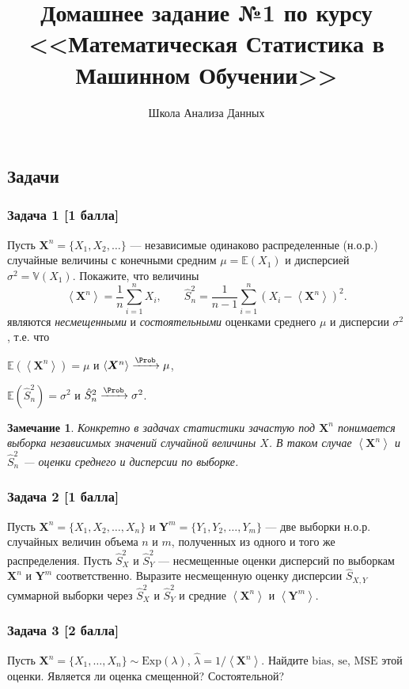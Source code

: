 \documentclass{article}
\title{Домашнее задание №1 по курсу \\ <<Математическая Статистика в Машинном Обучении>>}
\author{Школа Анализа Данных}
\date{}
\newcommand{\Sum}{\sum\limits}
\newcommand{\Var}{\mathbb{V}}
\newcommand{\Exp}{\mathbb{E}}
\newcommand{\angmean}[1]{\left\langle #1 \right\rangle}
\newcommand{\estS}{\hat{S}}
\newcommand{\boldX}{\boldsymbol{X}}
\newcommand{\boldY}{\boldsymbol{Y}}
\newcommand{\Exponential}{\mathrm{Exp}\xspace}
\newcommand{\hatlambda}{\hat{\lambda}}
\newcommand{\bias}{\ensuremath{\mathrm{bias}\xspace}}
\newcommand{\se}{\ensuremath{\mathrm{se}\xspace}}
\newcommand{\MSE}{\ensuremath{\mathrm{MSE}\xspace}}
\renewenvironment{itemize}[1]{\begin{compactitem}#1}{\end{compactitem}}
\newtheorem*{note-none}{Замечание}
\begin{document}
\maketitle

\subsection*{Задачи}

\subsubsection*{Задача 1 [1 балла]}
Пусть $\boldX^n = \{X_1, X_2, \dots\}$ --- независимые одинаково распределенные (н.о.р.) случайные величины  с конечными средним $\mu = \Exp(X_1)$ и дисперсией $\sigma^2 = \Var(X_1)$. Покажите, что величины
$$
\angmean{\boldX^n} = \frac{1}{n}\Sum_{i=1}^n X_i, \qquad \estS^2_n = \frac{1}{n - 1}\Sum_{i=1}^n (X_i - \angmean{\boldX^n})^2.
$$
являются \textit{несмещенными} и \textit{состоятельными} оценками среднего $\mu$ и дисперсии $\sigma^2$, т.е. что
\begin{itemize}
	\item $\Exp(\angmean{\boldX^n}) = \mu$ и $\angmean{\boldX^n} \xrightarrow{\Prob} \mu$,
	\item $\Exp(\estS^2_n) = \sigma^2$ и $\estS_n^2 \xrightarrow{\Prob} \sigma^2$.
\end{itemize}

\begin{note-none}
	Конкретно в задачах статистики зачастую под $\boldX^n$ понимается выборка независимых значений случайной величины $X$. В таком случае $\angmean{\boldX^n}$ и $\estS^2_n$ --- оценки среднего и дисперсии по выборке.
\end{note-none}

\subsubsection*{Задача 2 [1 балла]}
Пусть $\boldX^n = \{X_1, X_2, \dots, X_n\}$ и $\boldY^m = \{Y_1, Y_2, \dots, Y_m\}$ --- две выборки н.о.р. случайных величин объема $n$ и $m$, полученных из одного и того же распределения. Пусть $\estS^2_X$ и $\estS^2_Y$ --- несмещенные оценки дисперсий по выборкам $\boldX^n$ и $\boldY^m$ соответственно. Выразите несмещенную оценку дисперсии $\estS_{X, Y}$ суммарной выборки через $\estS^2_X$ и $\estS^2_Y$ и средние $\angmean{\boldX^n}$ и $\angmean{\boldY^m}$.

\subsubsection*{Задача 3 [2 балла]}
Пусть $\boldX^n = \{X_1, \dots, X_n\} \sim \Exponential(\lambda)$, $\hatlambda = 1 / \angmean{\boldX^n}$. Найдите $\bias$, $\se$, $\MSE$ этой оценки. Является ли оценка смещенной? Состоятельной?
\end{document}
